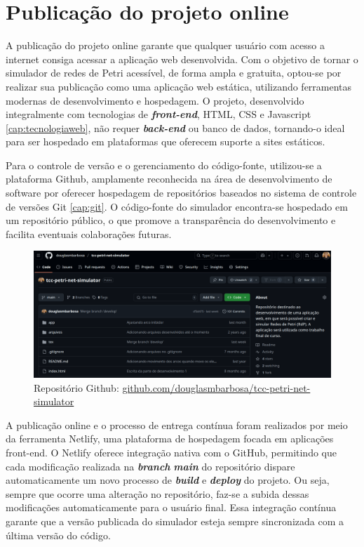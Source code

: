 \documentclass[
	12pt,				%
	openright,			%
	oneside,			%
	a4paper,			%
	english,			%
	brazil				%
	]{abntex2}
\begin{document}
\section{Publicação do projeto online}

A publicação do projeto online garante que qualquer usuário com acesso a internet consiga acessar a aplicação web desenvolvida. Com o objetivo de tornar o simulador de redes de Petri acessível, de forma ampla e gratuita, optou-se por realizar sua publicação como uma aplicação web estática, utilizando ferramentas modernas de desenvolvimento e hospedagem. O projeto, desenvolvido integralmente com tecnologias de \textbf{\textit{front-end}}, HTML, CSS e Javascript \ref{cap:tecnologiaweb}, não requer \textbf{\textit{back-end}} ou banco de dados, tornando-o ideal para ser hospedado em plataformas que oferecem suporte a sites estáticos. 

Para o controle de versão e o gerenciamento do código-fonte, utilizou-se a plataforma Github, amplamente reconhecida na área de desenvolvimento de software por oferecer hospedagem de repositórios baseados no sistema de controle de versões Git  \ref{cap:git}. O código-fonte do simulador encontra-se hospedado em um repositório público, o que promove a transparência do desenvolvimento e facilita eventuais colaborações futuras. 

\begin{figure}[ht] 
	\centering
	\includegraphics[scale=0.33]{figuras/repoGithub.png}
	\caption[Repositório Github]{Repositório Github:  \href{https://github.com/douglasmbarbosa/tcc-petri-net-simulator}{github.com/douglasmbarbosa/tcc-petri-net-simulator}}
	\label{fig:repoGithub}
\end{figure}
\FloatBarrier

A publicação online e o processo de entrega contínua foram realizados por meio da ferramenta Netlify, uma plataforma de hospedagem focada em aplicações front-end. O Netlify oferece integração nativa com o GitHub, permitindo que cada modificação realizada na \textbf{\textit{branch}} \textbf{\textit{main}} do repositório dispare automaticamente um novo processo de \textbf{\textit{build}} e \textbf{\textit{deploy}} do projeto. Ou seja, sempre que ocorre uma alteração no repositório, faz-se a subida dessas modificações automaticamente para o usuário final. Essa integração contínua garante que a versão publicada do simulador esteja sempre sincronizada com a última versão do código. 
\end{document}
